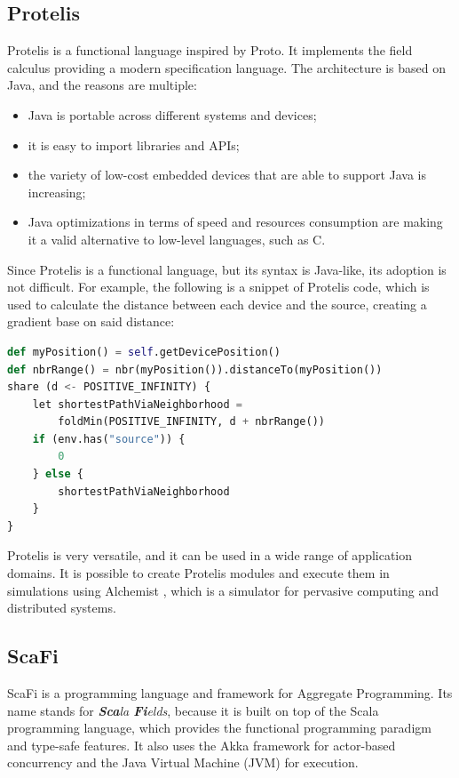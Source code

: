 \subsection{Protelis}\label{protelis}
Protelis \cite{protelis_introduction} is a functional language inspired by Proto. It implements the field calculus providing a modern specification language.\newline
The architecture is based on Java, and the reasons are multiple:
\begin{itemize}
    \item Java is portable across different systems and devices;
    \item it is easy to import libraries and APIs;
    \item the variety of low-cost embedded devices that are able to support Java is increasing;
    \item Java optimizations in terms of speed and resources consumption are making it a valid alternative to low-level languages, such as C.
\end{itemize}

Since Protelis is a functional language, but its syntax is Java-like, its adoption is not difficult.
For example, the following is a snippet of Protelis code, which is used to calculate the distance between each device and the source, creating a gradient base on said distance:
\begin{lstlisting}[language=Python, caption=Protelis example, captionpos=b]
def myPosition() = self.getDevicePosition()
def nbrRange() = nbr(myPosition()).distanceTo(myPosition())
share (d <- POSITIVE_INFINITY) {
    let shortestPathViaNeighborhood = 
        foldMin(POSITIVE_INFINITY, d + nbrRange())
    if (env.has("source")) { 
        0 
    } else {
        shortestPathViaNeighborhood
    }
}
\end{lstlisting}

Protelis is very versatile, and it can be used in a wide range of application domains. It is possible to create Protelis modules and execute them in simulations using Alchemist \cite{alchemist}, which is a simulator for pervasive computing and distributed systems.

\subsection{ScaFi}
ScaFi \cite{scafi_introduction} is a programming language and framework for Aggregate Programming. Its name stands for \textit{\textbf{Sca}la \textbf{Fi}elds}, because it is built on top of the Scala programming language, which provides the functional programming paradigm and type-safe features. It also uses the Akka framework for actor-based concurrency and the Java Virtual Machine (JVM) for execution.

